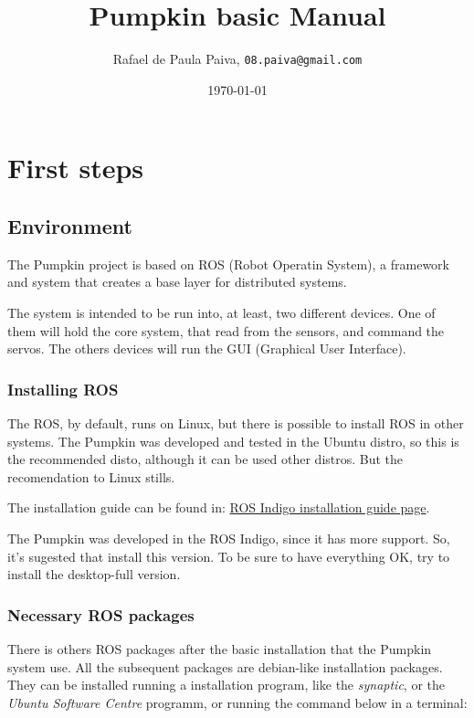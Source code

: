 \documentclass[oneside,a4paper,titlepage]{article}
\title{Pumpkin basic Manual}
\author{Rafael de Paula Paiva,
		\texttt{08.paiva@gmail.com}
		}
\date{\today}
\begin{document}
\maketitle
\tableofcontents
\newpage

\section{First steps}

\subsection{Environment}

The Pumpkin project is based on ROS (Robot Operatin System), a framework and system that creates a base layer for distributed systems.

The system is intended to be run into, at least, two different devices. One of them will hold the core system, that read from the sensors, and command the servos. The others devices will run the GUI (Graphical User Interface).

\subsubsection{Installing ROS}

The ROS, by default, runs on Linux, but there is possible to install ROS in other systems. The Pumpkin was developed and tested in the Ubuntu distro, so this is the recommended disto, although it can be used other distros. But the recomendation to Linux stills.

The installation guide can be found in: \href{http://wiki.ros.org/indigo/Installation}{ROS Indigo installation guide page}.

The Pumpkin was developed in the ROS Indigo, since it has more support. So, it's sugested that install this version. To be sure to have everything OK, try to install the desktop-full version.

\subsubsection{Necessary ROS packages}

There is others ROS packages after the basic installation that the Pumpkin system use. All the subsequent packages are debian-like installation packages. They can be installed running a installation program, like the \textit{synaptic}, or the \textit{Ubuntu Software Centre} programm, or running the command below in a terminal:
\end{document}
